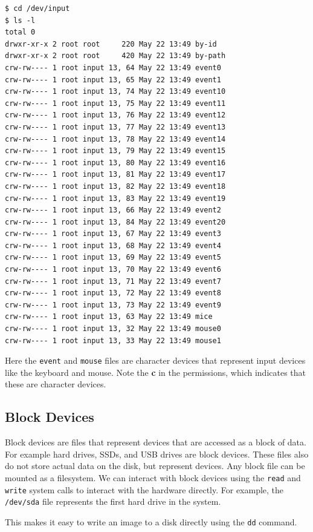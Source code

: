 \begin{lstlisting}
$ cd /dev/input
$ ls -l
total 0
drwxr-xr-x 2 root root     220 May 22 13:49 by-id
drwxr-xr-x 2 root root     420 May 22 13:49 by-path
crw-rw---- 1 root input 13, 64 May 22 13:49 event0
crw-rw---- 1 root input 13, 65 May 22 13:49 event1
crw-rw---- 1 root input 13, 74 May 22 13:49 event10
crw-rw---- 1 root input 13, 75 May 22 13:49 event11
crw-rw---- 1 root input 13, 76 May 22 13:49 event12
crw-rw---- 1 root input 13, 77 May 22 13:49 event13
crw-rw---- 1 root input 13, 78 May 22 13:49 event14
crw-rw---- 1 root input 13, 79 May 22 13:49 event15
crw-rw---- 1 root input 13, 80 May 22 13:49 event16
crw-rw---- 1 root input 13, 81 May 22 13:49 event17
crw-rw---- 1 root input 13, 82 May 22 13:49 event18
crw-rw---- 1 root input 13, 83 May 22 13:49 event19
crw-rw---- 1 root input 13, 66 May 22 13:49 event2
crw-rw---- 1 root input 13, 84 May 22 13:49 event20
crw-rw---- 1 root input 13, 67 May 22 13:49 event3
crw-rw---- 1 root input 13, 68 May 22 13:49 event4
crw-rw---- 1 root input 13, 69 May 22 13:49 event5
crw-rw---- 1 root input 13, 70 May 22 13:49 event6
crw-rw---- 1 root input 13, 71 May 22 13:49 event7
crw-rw---- 1 root input 13, 72 May 22 13:49 event8
crw-rw---- 1 root input 13, 73 May 22 13:49 event9
crw-rw---- 1 root input 13, 63 May 22 13:49 mice
crw-rw---- 1 root input 13, 32 May 22 13:49 mouse0
crw-rw---- 1 root input 13, 33 May 22 13:49 mouse1
\end{lstlisting}

Here the \texttt{event} and \texttt{mouse} files are character devices that represent input devices like the keyboard and mouse.
Note the \textbf{c} in the permissions, which indicates that these are character devices.

\subsection{Block Devices}

Block devices are files that represent devices that are accessed as a block of data.
For example hard drives, SSDs, and USB drives are block devices.
These files also do not store actual data on the disk, but represent devices.
Any block file can be mounted as a filesystem.
We can interact with block devices using the \texttt{read} and \texttt{write} system calls to interact with the hardware directly.
For example, the \texttt{/dev/sda} file represents the first hard drive in the system.

This makes it easy to write an image to a disk directly using the \texttt{dd} command.

